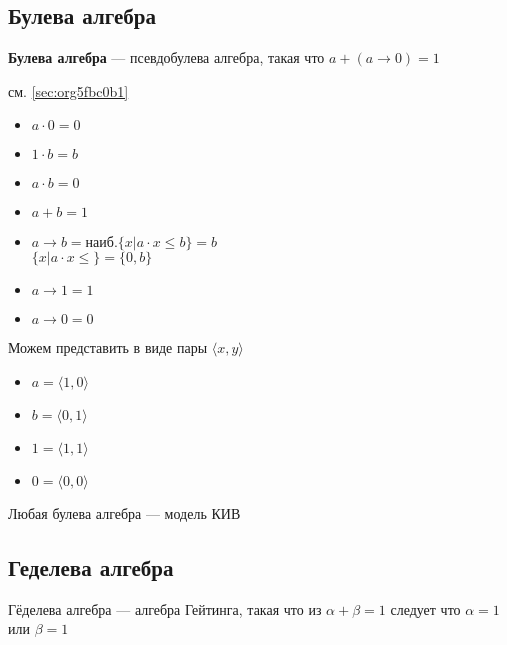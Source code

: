 \documentclass[english]{article}
\begin{document}
\subsection{Булева алгебра}
\label{sec:orgc8e9721}
\begin{definition}
	\textbf{Булева алгебра} --- псевдобулева алгебра, такая что \(a + (a \to 0) = 1\)
	\label{orga6556e1}
\end{definition}
\begin{examp}
	см. \ref{sec:org5fbc0b1}
\end{examp}
\begin{examp}
	\-
	\begin{center}
	\end{center}
	\begin{itemize}
		\item \(a \cdot 0 = 0\)
		\item \(1\cdot b = b\)
		\item \(a \cdot b = 0\)
		\item \(a + b = 1\)
		\item \(a \to b = \text{наиб.}\{x \big| a\cdot x \le b\} = b\) \\
		      \(\{x \big| a \cdot x \le \} = \{0, b\}\)
		\item \(a \to 1 = 1\)
		\item \(a \to 0 = 0\)
	\end{itemize}
	Можем представить в виде пары \(\langle x, y \rangle\)
	\begin{itemize}
		\item \(a = \langle 1, 0 \rangle\)
		\item \(b = \langle 0 , 1\rangle\)
		\item \(1 = \langle 1, 1 \rangle\)
		\item \(0 = \langle 0, 0 \rangle\)
	\end{itemize}
	\label{org1090a03}
\end{examp}
\begin{theorem}
	Любая булева алгебра --- модель КИВ
	\label{orgf408481}
\end{theorem}
\subsection{Геделева алгебра}
\label{sec:org479435c}
\begin{definition}
	Гёделева алгебра --- алгебра Гейтинга, такая что из \(\alpha + \beta = 1\) следует что \(\alpha = 1\) или \(\beta = 1\) \\
	\label{org2cc5286}
\end{definition}
\end{document}
